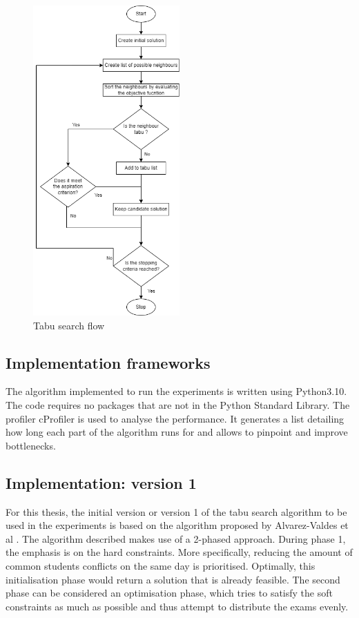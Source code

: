 \begin{figure}[h]
	\centering
	\includegraphics[width=0.5\textwidth]{images/tabu.drawio.png} 
	\caption{Tabu search flow}
	\label{fig:tabu-chart}
\end{figure}

\subsection{Implementation frameworks}

The algorithm implemented to run the experiments is written using Python3.10. The code requires no packages that are not in the Python Standard Library. The profiler cProfiler is used to analyse the performance. It generates a list detailing how long each part of the algorithm runs for and allows to pinpoint and improve bottlenecks.

\subsection{Implementation: version 1}
For this thesis, the initial version or version 1 of the tabu search algorithm to be used in the experiments is based on the algorithm proposed by Alvarez-Valdes et al \cite{alvarez1997}. The algorithm described makes use of a 2-phased approach. During phase 1, the emphasis is on the hard constraints. More specifically, reducing the amount of common students conflicts on the same day is prioritised. Optimally, this initialisation phase would return a solution that is already feasible. The second phase can be considered an optimisation phase, which tries to satisfy the soft constraints as much as possible and thus attempt to distribute the exams evenly.

